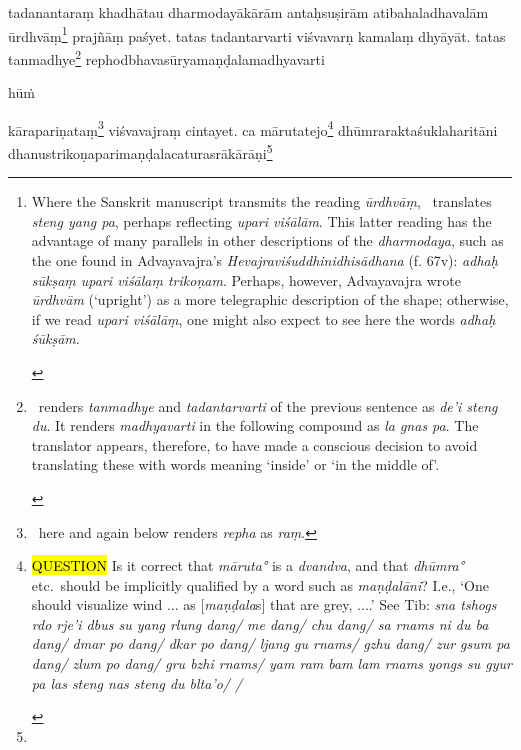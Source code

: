 \documentclass[naipra.tex]{subfiles}
\begin{document}
\begin{sanskrit}
\pstart
tadanantaraṃ khadhātau dharmodayākārām antaḥsuṣirām atibahaladhavalām ūrdhvāṃ\footnote{\begin{english}
	Where the Sanskrit manuscript transmits the reading \emph{ūrdhvāṃ}, \TIB\ translates \emph{steng yang pa}, perhaps reflecting \emph{upari viśālām}.
	This latter reading has the advantage of many parallels in other descriptions of the \emph{dharmodaya}, such as the one found in Advayavajra's \emph{Hevajraviśuddhinidhisādhana} (f. 67v): \emph{adhaḥ sūkṣaṃ upari viśālaṃ trikoṇam}.
	Perhaps, however, Advayavajra wrote \emph{ūrdhvām} (`upright') as a more telegraphic description of the shape; otherwise, if we read \emph{upari viśālāṃ}, one might also expect to see here the words \emph{adhaḥ śūkṣām}. 
\end{english}} prajñāṃ paśyet.
tatas tadantarvarti viśvavarṇ  kamalaṃ dhyāyāt.
tatas tanmadhye\footnote{\begin{english}
	\TIB\ renders \emph{tanmadhye} and \emph{tadantarvarti} of the previous sentence as \emph{de'i steng du}.
	It renders \emph{madhyavarti} in the following compound as \emph{la gnas pa}.  
	The translator appears, therefore, to have made a conscious decision to avoid translating these with words meaning `inside' or `in the middle of'.
\end{english}} rephodbhavasūryamaṇḍalamadhyavarti\dsh \begin{mantra}hūṁ\end{mantra}\dsh kārapariṇataṃ\footnote{
	\TIB\ here and again below renders \emph{repha} as \emph{raṃ}.
} viśvavajraṃ cintayet. 
 ca mārutatejo\footnote{\begin{english}
	\hl{QUESTION} Is it correct that \emph{māruta°} is a \emph{dvandva}, and that \emph{dhūmra°} etc.\ should be implicitly qualified by a word such as \emph{maṇḍalāni}? I.e., `One should visualize wind ... as [\emph{maṇḍala}s] that are grey, ....' See Tib: \emph{sna tshogs rdo rje'i dbus su yang rlung dang/ me dang/ chu dang/ sa rnams ni du ba dang/ dmar po dang/ dkar po dang/ ljang gu rnams/ gzhu dang/ zur gsum pa dang/ zlum po dang/ gru bzhi rnams/ yam ram bam lam rnams yongs su gyur pa las steng nas steng du blta'o/ /}
\end{english}} dhūmraraktaśuklaharitāni dhanustrikoṇaparimaṇḍalacaturasrākārāṇi\footnote{
}
\end{sanskrit}
\end{document}
